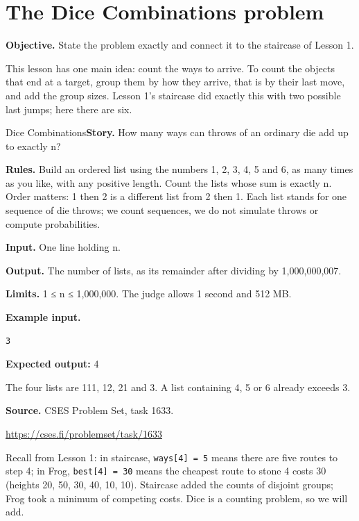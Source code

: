 \documentclass[11pt,a4paper,oneside]{report}
\newcommand{\classref}[1]{\marginpar{\raggedright\fontsize{9}{12}\selectfont\color{quiet}\colorbox{wash}{\heavy\fontsize{8}{10}\selectfont IN THE CLASSROOM}\par\smallskip#1}}
\newcommand{\sectiongoal}[1]{\par{\color{quiet}\textbf{Objective.} #1}\par\smallskip}
\begin{document}
\section{The Dice Combinations problem}
\classref{L2-01\\L2-02}
\sectiongoal{State the problem exactly and connect it to the staircase of Lesson 1.}
This lesson has one main idea: count the ways to arrive. To count the objects that end at a target, group them by how they arrive, that is by their last move, and add the group sizes. Lesson 1's staircase did exactly this with two possible last jumps; here there are six.

\begin{problembox}{Dice Combinations}\textbf{Story.} How many ways can throws of an ordinary die add up to exactly n?\par\smallskip \textbf{Rules.} Build an ordered list using the numbers 1, 2, 3, 4, 5 and 6, as many times as you like, with any positive length. Count the lists whose sum is exactly n. Order matters: 1 then 2 is a different list from 2 then 1. Each list stands for one sequence of die throws; we count sequences, we do not simulate throws or compute probabilities.\par\smallskip \textbf{Input.} One line holding n.\par\smallskip \textbf{Output.} The number of lists, as its remainder after dividing by 1,000,000,007.\par\smallskip \textbf{Limits.} 1 ≤ n ≤ 1,000,000. The judge allows 1 second and 512 MB.\par\smallskip \textbf{Example input.}
\begin{lstlisting}[language={},aboveskip=2pt,belowskip=2pt]
3
\end{lstlisting}
\textbf{Expected output:} 4\par\smallskip The four lists are 111, 12, 21 and 3. A list containing 4, 5 or 6 already exceeds 3.\par\smallskip\textbf{Source.} CSES Problem Set, task 1633.\par\url{https://cses.fi/problemset/task/1633}\end{problembox}
Recall from Lesson 1: in staircase, \texttt{ways[4] = 5} means there are five routes to step 4; in Frog, \texttt{best[4] = 30} means the cheapest route to stone 4 costs 30 (heights 20, 50, 30, 40, 10, 10). Staircase added the counts of disjoint groups; Frog took a minimum of competing costs. Dice is a counting problem, so we will add.
\end{document}
